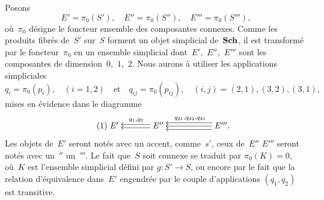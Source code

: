 Posons
$$
E'=\pi_0(S'), \quad E''=\pi_0(S''), \quad E'''=\pi_0(S'''),
$$
o\`u~$\pi_0$ d\'esigne le foncteur \og ensemble des composantes
connexes\fg. Comme les produits fibr\'es de~$S'$ sur~$S$ forment un
objet simplicial de~$\mathbf{Sch}$, il est transform\'e par le
foncteur~$\pi_0$ en un ensemble simplicial dont~$E'$,~$E''$,~$E'''$
sont les composantes de dimension~$0$,~$1$,~$2$. Nous aurons \`a
utiliser les applications simpliciales
$$
q_i=\pi_0(p_i),\quad(i=1,2)\quad\text{et}
\quad q_{ij}=\pi_0(p_{ij}),\quad (i,j)=(2,1),(3,2),(3,1),
$$
mises en \'evidence dans le diagramme
\begin{equation*}
\label{eq:IX.5.1}
\tag{1} {\xymatrix@C=.5cm{{E'}&&{E''}\ar@<2pt>[ll]\ar@<-2pt>[ll]_{q_1,q_2}&&&{E'''.}\ar@<4pt>[lll]\ar[lll]\ar@<-4pt>[lll]_{q_{21},q_{32},q_{31}}}}
\end{equation*}
Les objets
de~$E'$ seront not\'es avec un accent, comme~$s'$, ceux
de~$E''$ \resp $E'''$ seront not\'es avec un~$''$ \resp un~$'''$.
Le fait que~$S$ soit connexe se traduit par $\pi_0(K)=0$, o\`u~$K$
est l'ensemble simplicial d\'efini par $g\colon S'\to S$, ou encore
par le fait que la relation d'\'equivalence dans~$E'$ engendr\'ee
par le couple d'applications $(q_1,q_2)$ est transitive.

